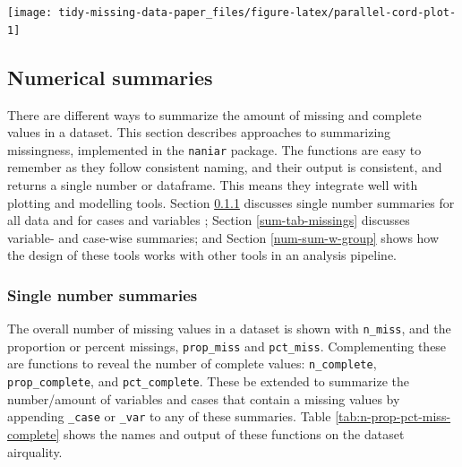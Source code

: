 \documentclass[]{article}
\let\origfigure\figure
\let\endorigfigure\endfigure
\renewenvironment{figure}[1][2] {
    \expandafter\origfigure\expandafter[H]
} {
    \endorigfigure
}
\theoremstyle{definition}
\theoremstyle{definition}
\theoremstyle{definition}
\theoremstyle{remark}
\begin{document}
\begin{figure}

{\centering \texttt{[image: tidy-missing-data-paper\_files/figure-latex/parallel-cord-plot-1]} 

}

\caption{Parallel coordinate plot shows missing values imputed 10\% below range for the oceanbuoys dataset. Values are colored by missingness of humidity. Humidity is missing for low air and sea temperatures, and is missing for one year and one location. }\label{fig:parallel-cord-plot}
\end{figure}

\hypertarget{num-sum}{%
\subsection{Numerical summaries}\label{num-sum}}

There are different ways to summarize the amount of missing and complete
values in a dataset. This section describes approaches to summarizing
missingness, implemented in the \texttt{naniar} package. The functions
are easy to remember as they follow consistent naming, and their output
is consistent, and returns a single number or dataframe. This means they
integrate well with plotting and modelling tools. Section
\ref{single-num-sum} discusses single number summaries for all data and
for cases and variables ; Section \ref{sum-tab-missings} discusses
variable- and case-wise summaries; and Section \ref{num-sum-w-group}
shows how the design of these tools works with other tools in an
analysis pipeline.

\hypertarget{single-num-sum}{%
\subsubsection{Single number summaries}\label{single-num-sum}}

The overall number of missing values in a dataset is shown with
\texttt{n\_miss}, and the proportion or percent missings,
\texttt{prop\_miss} and \texttt{pct\_miss}. Complementing these are
functions to reveal the number of complete values: \texttt{n\_complete},
\texttt{prop\_complete}, and \texttt{pct\_complete}. These be extended
to summarize the number/amount of variables and cases that contain a
missing values by appending \texttt{\_case} or \texttt{\_var} to any of
these summaries. Table \ref{tab:n-prop-pct-miss-complete} shows the
names and output of these functions on the dataset airquality.
\end{document}
